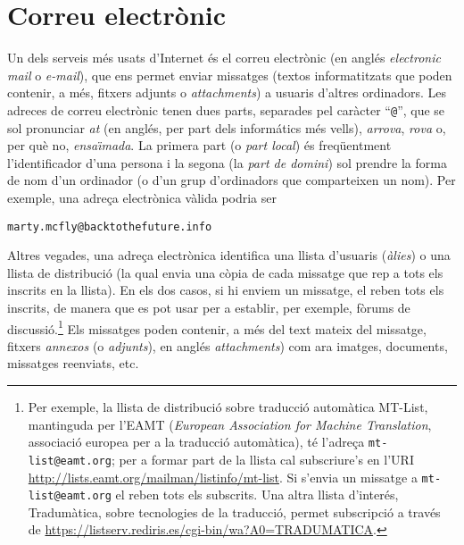 \section{Correu electrònic}
\label{ss:correue}
Un dels serveis més usats d'Internet és el correu electrònic (en
anglés \emph{electronic mail} o \emph{e-mail}), que ens permet enviar
missatges (textos informatitzats que poden contenir, a més, fitxers
adjunts o \emph{attachments}) a usuaris d'altres ordinadors.  Les
adreces de correu electrònic tenen dues parts, separades pel caràcter
``{\tt @}'', que se sol pronunciar \emph{at} (en anglés, per part dels
informátics més vells), {\em arrova}, \emph{rova} o, per què no,
\emph{ensa\"{\i}mada}. La primera part (o \emph{part local}) és
freqüentment l'identificador d'una persona i la segona (la \emph{part
  de domini}) sol prendre la forma de nom d'un ordinador (o d'un grup
d'ordinadors que comparteixen un nom). Per exemple, una adreça
electrònica vàlida podria ser
\begin{center}
{\tt marty.mcfly@backtothefuture.info}
\end{center}
Altres vegades, una adreça electrònica identifica una llista
d'usuaris (\emph{àlies}) o una llista de distribució (la qual
envia una còpia de cada missatge que rep a tots els inscrits en la
llista). En els dos casos, si hi enviem un missatge, el reben tots els
inscrits, de manera que es pot usar per a establir, per exemple,
fòrums de discussió.\footnote{Per exemple, la llista de
  distribució sobre traducció automàtica MT-List, mantinguda per l'EAMT
  (\emph{European Association for Machine Translation}, associació
  europea per a la traducció automàtica), té l'adreça
  \texttt{mt-list@eamt.org}; per a formar part de la llista cal
  subscriure's en l'URI
  \url{http://lists.eamt.org/mailman/listinfo/mt-list}. Si
  s'envia un missatge a \texttt{mt-list@eamt.org} el reben tots els
  subscrits. Una altra llista d'interés, Tradumàtica, sobre tecnologies de la traducció, permet subscripció a través de \url{https://listserv.rediris.es/cgi-bin/wa?A0=TRADUMATICA}.}
  \label{pg:annex} Els missatges poden contenir, a més del text mateix
  del missatge, fitxers \emph{annexos} (o \emph{adjunts}), en anglés {\em
    attachments}) com ara imatges,  documents, missatges reenviats, etc.


